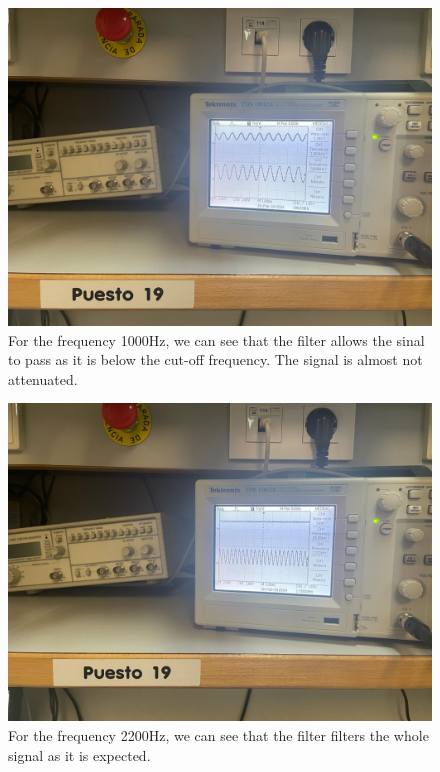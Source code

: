 \documentclass[a4paper, 12pt]{article}
\begin{document}
\begin{figure}[htbp]
\centering
\includegraphics[width=.9\linewidth]{./img/oscilloscope_f_1000.jpg}
\caption{For the frequency 1000Hz, we can see that the filter allows the sinal to pass as it is below the cut-off frequency. The signal is almost not attenuated.}
\end{figure}

\begin{figure}[htbp]
\centering
\includegraphics[width=.9\linewidth]{./img/oscilloscope_f_2200.jpg}
\caption{For the frequency 2200Hz, we can see that the filter filters the whole signal as it is expected.}
\end{figure}
\end{document}
